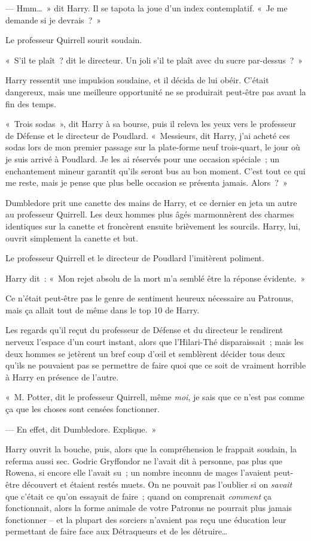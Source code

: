 --- Hmm…~»
dit Harry.
Il se tapota la joue d'un index contemplatif.
«~Je me demande si je devrais~?~»

Le professeur Quirrell sourit soudain.

«~S'il te plaît~? dit le directeur.
Un joli s'il te plaît avec du sucre par-dessus~?~»

Harry ressentit une impulsion soudaine, et il décida de lui obéir.
C'était dangereux, mais une meilleure opportunité ne se produirait peut-être pas avant la fin des temps.

«~Trois sodas~», dit Harry à sa bourse, puis il releva les yeux vers le professeur de Défense et le directeur de Poudlard.
«~Messieurs, dit Harry, j'ai acheté ces sodas lors de mon premier passage sur la plate-forme neuf trois-quart, le jour où je suis arrivé à Poudlard.
Je les ai réservés pour une occasion spéciale~; un enchantement mineur garantit qu'ils seront bus au bon moment.
C'est tout ce qui me reste, mais je pense que plus belle occasion se présenta jamais.
Alors~?~»

Dumbledore prit une canette des mains de Harry, et ce dernier en jeta un autre au professeur Quirrell.
Les deux hommes plus âgés marmonnèrent des charmes identiques sur la canette et froncèrent ensuite brièvement les sourcils.
Harry, lui, ouvrit simplement la canette et but.

Le professeur Quirrell et le directeur de Poudlard l'imitèrent poliment.

Harry dit~: «~Mon rejet absolu de la mort m'a semblé être la réponse évidente.~»

Ce n'était peut-être pas le genre de sentiment heureux nécessaire au Patronus, mais ça allait tout de même dans le top 10 de Harry.

Les regards qu'il reçut du professeur de Défense et du directeur le rendirent nerveux l'espace d'un court instant, alors que l'Hilari-Thé disparaissait~; mais les deux hommes se jetèrent un bref coup d'œil et semblèrent décider tous deux qu'ils ne pouvaient pas se permettre de faire quoi que ce soit de vraiment horrible à Harry en présence de l'autre.

«~M. Potter, dit le professeur Quirrell, même \emph{moi}, je sais que ce n'est pas comme ça que les choses sont censées fonctionner.

--- En effet, dit Dumbledore.
Explique.~»

Harry ouvrit la bouche, puis, alors que la compréhension le frappait soudain, la referma aussi sec.
Godric Gryffondor ne l'avait dit à personne, pas plus que Rowena, si encore elle l'avait su~; un nombre inconnu de mages l'avaient peut-être découvert et étaient restés muets.
On ne pouvait pas l'oublier si on \emph{savait} que c'était ce qu'on essayait de faire~; quand on comprenait \emph{comment} ça fonctionnait, alors la forme animale de votre Patronus ne pourrait plus jamais fonctionner -- et la plupart des sorciers n'avaient pas reçu une éducation leur permettant de faire face aux Détraqueurs et de les détruire…

